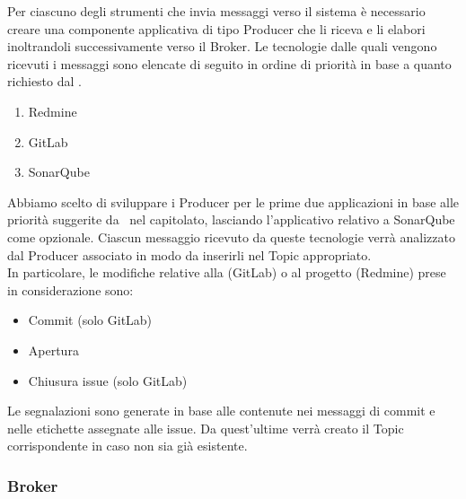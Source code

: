 		Per ciascuno degli strumenti che invia messaggi verso il sistema è necessario creare una componente applicativa di tipo Producer che li riceva e li elabori inoltrandoli successivamente verso il Broker.
		Le tecnologie dalle quali vengono ricevuti i messaggi sono elencate di seguito in ordine di priorità in base a quanto richiesto dal .
		\begin{enumerate}
			\item Redmine
			\item GitLab
			\item SonarQube
		\end{enumerate}
		Abbiamo scelto di sviluppare i Producer per le prime due applicazioni in base alle priorità suggerite da \II\ nel capitolato, lasciando l'applicativo relativo a SonarQube come opzionale.
		Ciascun messaggio ricevuto da queste tecnologie verrà analizzato dal Producer associato in modo da inserirli nel Topic appropriato.\\
		In particolare, le modifiche relative alla  (GitLab) o al progetto (Redmine) prese in considerazione sono:
		\begin{itemize}
			\item Commit (solo GitLab)
			\item Apertura  
			\item Chiusura issue (solo GitLab)
		\end{itemize}
		Le segnalazioni sono generate in base alle  contenute nei messaggi di commit e nelle etichette assegnate alle issue.
		Da quest'ultime verrà creato il Topic corrispondente in caso non sia già esistente.
		
		
		
	\subsubsection{Broker}\label{TecnologieBroker}
	
